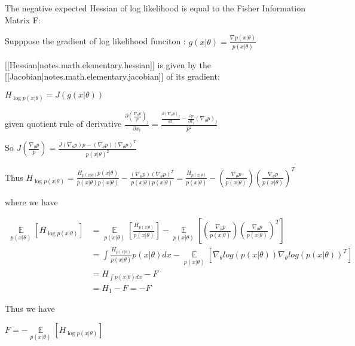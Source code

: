 The negative expected Hessian of log likelihood is equal to the Fisher Information Matrix F:

Supppose the gradient of log likelihood funciton : $g(x|\theta)=\frac{\nabla p(x|\theta)}{p(x|\theta)}$

[[Hessian|notes.math.elementary.hessian]] is given by the [[Jacobian|notes.math.elementary.jacobian]] of its gradient:

$H_{\log p(x|\theta)}=J(g(x|\theta))$

given quotient rule of derivative $\frac{\partial (\frac{\nabla_{\theta}p}{p})_j}{\partial x_i}=\frac{\frac{\partial (\nabla_\theta p)_j}{\partial x_i} - \frac{\partial p}{\partial x_i}(\nabla_\theta p)_j}{p^2}$

So $J(\frac{\nabla_\theta p}{p})=\frac{J(\nabla_\theta p)p-(\nabla_\theta p)(\nabla_\theta p)^T}{p(x|\theta)^2}$

Thus $H_{\log p(x|\theta)}=\frac{H_{p(x|\theta)}p(x|\theta)}{p(x|\theta)p(x|\theta)}-\frac{(\nabla_\theta p)(\nabla_\theta p)^T}{p(x|\theta)p(x|\theta)}=\frac{H_{p(x|\theta)}}{p(x|\theta)}-(\frac{\nabla_\theta p}{p(x|\theta)})(\frac{\nabla_\theta p}{p(x|\theta)})^T$

where we have 

\begin{equation}
    \begin{aligned}
    \mathop{\mathbb{E}}\limits_{p(x|\theta)}[ H_{\log{p(x|\theta)}}]
    & = \mathop{\mathbb{E}}\limits_{p(x|\theta)}[ \frac{H_{p(x|\theta)}}{p(x|\theta)} ] - \mathop{\mathbb{E}}\limits_{p(x|\theta)}[ (\frac{\nabla_\theta p}{p(x|\theta)})(\frac{\nabla_\theta p}{p(x|\theta)})^T ] \\
    & = \int \frac{H_{p(x|\theta)}}{p(x|\theta)} p(x|\theta)dx - \mathop{\mathbb{E}}\limits_{p(x|\theta)}[ \nabla_\theta log(p(x|\theta)) \nabla_\theta log(p(x|\theta))^T] \\ 
    & = H_{\int p(x|\theta)dx} - F \\ 
    & = H_1 - F = -F
    \end{aligned}
\end{equation}

Thus we have 

$F = -\mathop{\mathbb{E}}\limits_{p(x|\theta)}[ H_{\log{p(x|\theta)}} ]$